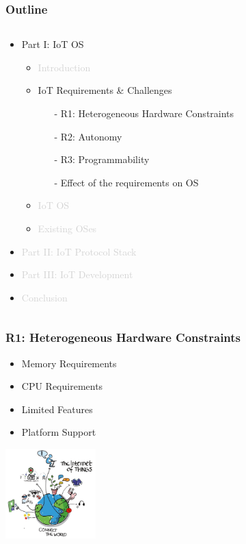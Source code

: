 \documentclass{beamer}
\begin{document}
\begin{frame}
	\frametitle{Outline}
	\begin{columns}[c]
		\begin{column}{30cm}
			\vspace{.1cm}
			\begin{itemize}
				\justifying
				\item Part I: IoT OS
				\begin{itemize}
					\item \textcolor{LightGray}{Introduction}
					\item IoT Requirements \& Challenges
					\begin{itemize}
						\item[-] R1: Heterogeneous Hardware Constraints
						\item[-] R2: Autonomy 
						\item[-] R3: Programmability
						\item[-] Effect of the requirements on OS
					\end{itemize}
					\item \textcolor{LightGray}{IoT OS}
					\item \textcolor{LightGray}{Existing OSes}
				\end{itemize}
				\item \textcolor{LightGray}{Part II: IoT Protocol Stack}
				\item \textcolor{LightGray}{Part III: IoT Development}
				\item \textcolor{LightGray}{Conclusion}
			\end{itemize}
		\end{column}
	\end{columns}
\end{frame}

\begin{frame}
	\frametitle{R1: Heterogeneous Hardware Constraints}
	\begin{itemize}
		\justifying
		\item Memory Requirements
		\item CPU Requirements
		\item Limited Features
		\item Platform Support
	\end{itemize}
	\hspace*{7cm} \includegraphics[width=3.5cm]{figs/Internet-of-Things-3.jpg}
\end{frame}
\end{document}
